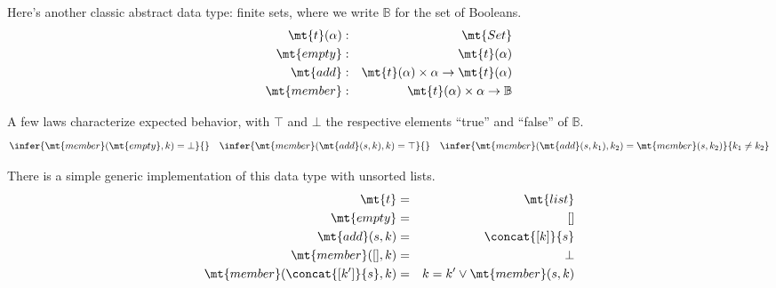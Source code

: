 \documentclass{amsbook}
\theoremstyle{definition}
\theoremstyle{remark}
\numberwithin{section}{chapter}
\numberwithin{equation}{chapter}
\begin{document}
Here's another classic abstract data type: finite sets, where we write $\mathbb B$ for the set of Booleans.
\begin{eqnarray*}
  \mt{t}(\alpha) &:& \mt{Set} \\
  \mt{empty} &:& \mt{t}(\alpha) \\
  \mt{add} &:& \mt{t}(\alpha) \times \alpha \to \mt{t}(\alpha) \\
  \mt{member} &:& \mt{t}(\alpha) \times \alpha \to \mathbb B
\end{eqnarray*}

A few laws characterize expected behavior, with $\top$ and $\bot$ the respective elements ``true'' and ``false'' of $\mathbb B$.
$$\infer{\mt{member}(\mt{empty}, k) = \bot}{}
\quad \infer{\mt{member}(\mt{add}(s, k), k) = \top}{}
\quad \infer{\mt{member}(\mt{add}(s, k_1), k_2) = \mt{member}(s, k_2)}{k_1 \neq k_2}$$

There is a simple generic implementation of this data type with unsorted lists.
\begin{eqnarray*}
  \mt{t} &=& \mt{list} \\
  \mt{empty} &=& [] \\
  \mt{add}(s, k) &=& \concat{[k]}{s} \\
  \mt{member}([], k) &=& \bot \\
  \mt{member}(\concat{[k']}{s}, k) &=& k = k' \lor \mt{member}(s, k)
\end{eqnarray*}
\end{document}
